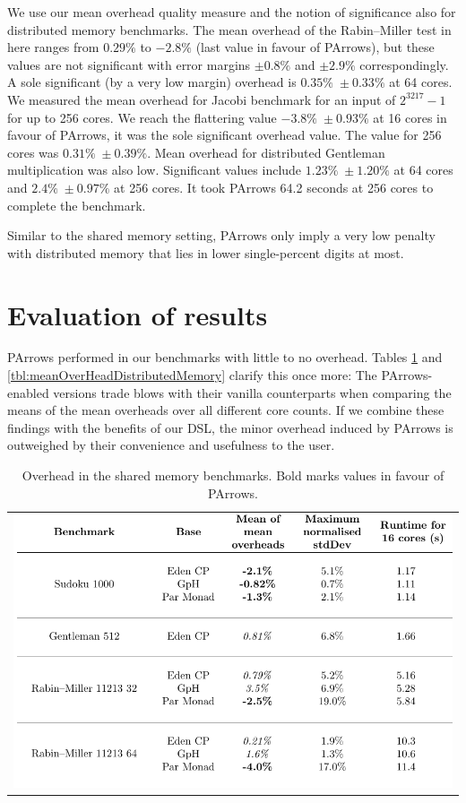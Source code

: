 \documentclass[paper=A4,twoside=true,openright,parskip=full,chapterprefix=true,headings=normal,bibliography=totoc,listof=totoc,titlepage=on,captions=tableabove,draft=false,british]{scrreprt}%
\begin{document}
We use our mean overhead quality measure and the notion of significance
also for distributed memory benchmarks. The mean overhead of the
Rabin--Miller test in here ranges from \(0.29\%\) to \(-2.8\%\) (last
value in favour of PArrows), but these values are not significant with
error margins \(\pm 0.8\%\) and \(\pm 2.9\%\) correspondingly. A sole
significant (by a very low margin) overhead is \(0.35\% \; \pm 0.33\%\)
at 64 cores. We measured the mean overhead for Jacobi benchmark for an
input of \(2^{3217}-1\) for up to 256 cores. We reach the flattering
value \(-3.8\% \; \pm 0.93\%\) at 16 cores in favour of PArrows, it was
the sole significant overhead value. The value for 256 cores was
\(0.31\% \; \pm 0.39\%\). Mean overhead for distributed Gentleman
multiplication was also low. Significant values include
\(1.23\% \; \pm 1.20\%\) at 64 cores and \(2.4\% \; \pm 0.97\%\) at 256
cores. It took PArrows 64.2 seconds at 256 cores to complete the
benchmark.

Similar to the shared memory setting, PArrows only imply a very low
penalty with distributed memory that lies in lower single-percent digits
at most.

\newpage

\hypertarget{evaluation-of-results}{%
\section{Evaluation of results}\label{evaluation-of-results}}

\label{sec:benchmarksEvaluation}

PArrows performed in our benchmarks with little to no overhead. Tables
\ref{tbl:meanOverheadSharedMemory} and
\ref{tbl:meanOverHeadDistributedMemory} clarify this once more: The
PArrows-enabled versions trade blows with their vanilla counterparts
when comparing the means of the mean overheads over all different core
counts. If we combine these findings with the benefits of our DSL, the
minor overhead induced by PArrows is outweighed by their convenience and
usefulness to the user.

\begin{longtable}[]{@{}l@{}}
\caption{Overhead in the shared memory benchmarks. Bold marks values in
favour of PArrows. \label{tbl:meanOverheadSharedMemory}}\tabularnewline
\includegraphics{src/img/bestAndWorstBenchmarks1.pdf}\tabularnewline
\end{longtable}
\end{document}
